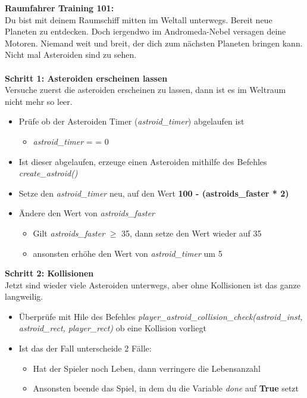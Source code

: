 \textbf{\large Raumfahrer Training 101:}\\
Du bist mit deinem Raumschiff mitten im Weltall unterwegs. Bereit neue Planeten zu entdecken. Doch iergendwo im Andromeda-Nebel versagen deine Motoren. Niemand weit und breit, der dich zum nächsten Planeten bringen kann. Nicht mal Asteroiden sind zu sehen.\\\\
\textbf{Schritt 1: Asteroiden erscheinen lassen}\\
Versuche zuerst die asteroiden erscheinen zu lassen, dann ist es im Weltraum nicht mehr so leer.
\begin{itemize}
	\item Prüfe ob der Asteroiden Timer (\textit{astroid\_timer}) abgelaufen ist
	\begin{itemize}
		\item \textit{astroid\_timer} = = 0
	\end{itemize}
	\item Ist dieser abgelaufen, erzeuge einen Asteroiden mithilfe des Befehles \textit{create\_astroid()}
	\item Setze den \textit{astroid\_timer} neu, auf den Wert \textbf{100 - (astroids\_faster * 2)}
	\item Ändere den Wert von \textit{astroids\_faster}
	\begin{itemize}
		\item Gilt \textit{astroids\_faster} $\geq$ 35, dann setze den Wert wieder auf 35
		\item ansonsten erhöhe den Wert von \textit{astroid\_timer} um 5
	\end{itemize}
\end{itemize}
\textbf{Schritt 2: Kollisionen}\\
Jetzt sind wieder viele Asteroiden unterwegs, aber ohne Kollisionen ist das ganze langweilig.
\begin{itemize}
	\item Überprüfe mit Hile des Befehles \textit{player\_astroid\_collision\_check(astroid\_inst, astroid\_rect, player\_rect)} ob eine Kollision vorliegt
	\item Ist das der Fall unterscheide 2 Fälle:
	\begin{itemize}
		\item Hat der Spieler noch Leben, dann verringere die Lebensanzahl
		\item Ansonsten beende das Spiel, in dem du die Variable \textit{done} auf \textbf{True} setzt
	\end{itemize}
\end{itemize}
